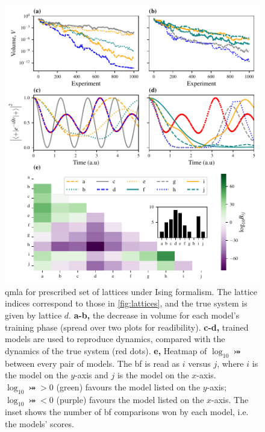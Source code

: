 \begin{figure}
    \begin{center}
        \includegraphics{theoretical_study/figures/lattice_qmla_summary.pdf}
    \end{center}
    \caption[QMLA for prescribed set of lattices under Ising formalism]{
        \gls{qmla} for prescribed set of lattices under Ising formalism. 
        The lattice indices correspond to those in \cref{fig:lattices}, 
            and the true system is given by lattice $d$. 
        \textbf{a-b,} the decrease in \gls{volume} for each model's training phase (spread over two plots for readibility).
        \textbf{c-d,} trained models are used to reproduce dynamics, compared with the dynamics of the
            true system (red dots). 
        \textbf{e,} Heatmap of $\log_{10} \bij$ between every pair of models. The \gls{bf} is read as 
        $i$ versus $j$, where $i$ is the model on the $y$-axis and $j$ is the model on the $x$-axis. 
        $\log_{10} \bij > 0$ (green) favours the model listed on the $y$-axis;
        $\log_{10} \bij < 0$ (purple) favours the model listed on the $x$-axis.
        The inset shows the number of \gls{bf} comparisons won by each model, i.e. the models' scores. 
        \figtableref
    }
    \label{fig:lattice_qmla_eg}
\end{figure}    

